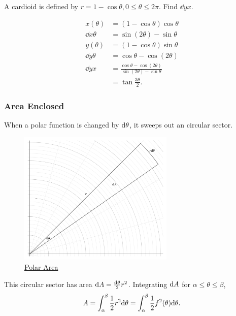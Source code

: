 \begin{example}
	A cardioid is defined by $r=1-\cos{\theta}, 0 \leq \theta \leq 2\pi$.
	Find $\dd{y}{x}$.
\end{example}
\begin{align*}
	x(\theta) &= \left(1-\cos{\theta}\right)\cos{\theta} \\
	\dd{x}{\theta} &= \sin{(2\theta)} - \sin{\theta} \\
	y(\theta) &= \left(1-\cos{\theta}\right)\sin{\theta} \\
	\dd{y}{\theta} &= \cos{\theta} - \cos{(2\theta)} \\
	\dd{y}{x} &= \frac{\cos{\theta} - \cos{(2\theta)}}{\sin{(2\theta)} - \sin{\theta}} \\
	&= \tan{\frac{3\theta}{2}}.
\end{align*}

\subsubsection{Area Enclosed}
When a polar function is changed by $\mathrm{d} \theta$, it sweeps out an circular sector.

\begin{figure}[H]
	\label{polar_area}
	\centering
	\includegraphics[width=0.66\textwidth]{./parametric_vector_polar/polar_area.png}
	\caption{\hyperref{}{}{}{Polar Area}}
\end{figure}

This circular sector has area $\mathrm{d} A = \frac{\mathrm{d} \theta}{2}r^2$.
Integrating $\mathrm{d} A$ for $\alpha \leq \theta \leq \beta$,
\begin{equation*}
	A = \int_{\alpha}^{\beta}{\frac{1}{2}r^2\mathrm{d} \theta} = \int_{\alpha}^{\beta}{\frac{1}{2}f^2(\theta)\mathrm{d} \theta}.
\end{equation*}

